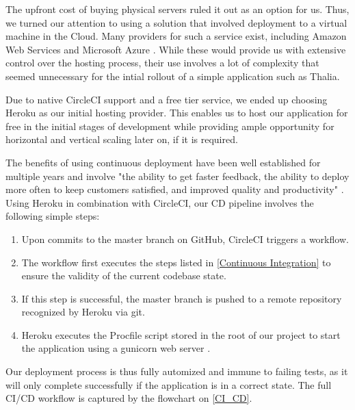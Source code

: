 The upfront cost of buying physical servers ruled it out as an option for us. Thus, we turned our attention to using a solution that involved deployment to a virtual machine in the Cloud. Many providers for such a service exist, including Amazon Web Services \cite{AWS} and Microsoft Azure \cite{Azure}. While these would provide us with extensive control over the hosting process, their use involves a lot of complexity that seemed unnecessary for the intial rollout of a simple application such as Thalia.

Due to native CircleCI support and a free tier service, we ended up choosing Heroku \cite{Heroku} as our initial hosting provider. This enables us to host our application for free in the initial stages of development while providing ample opportunity for horizontal and vertical scaling later on, if it is required.

The benefits of using continuous deployment have been well established for multiple years and involve "the ability to get faster feedback, the ability to deploy more often to keep customers satisfied, and improved quality and productivity" \cite{CDBenefits}. Using Heroku in combination with CircleCI, our CD pipeline involves the following simple steps:

\begin{enumerate}
    \item Upon commits to the master branch on GitHub, CircleCI triggers a workflow.
    \item The workflow first executes the steps listed in \ref{Continuous Integration} to ensure the validity of the current codebase state.
    \item If this step is successful, the master branch is pushed to a remote repository recognized by Heroku via git.
    \item Heroku executes the Procfile script stored in the root of our project to start the application using a gunicorn web server \cite{Gunicorn}.
\end{enumerate}

Our deployment process is thus fully automized and immune to failing tests, as it will only complete successfully if the application is in a correct state. The full CI/CD workflow is captured by the flowchart on \figurename{\ref{CI_CD}}.

